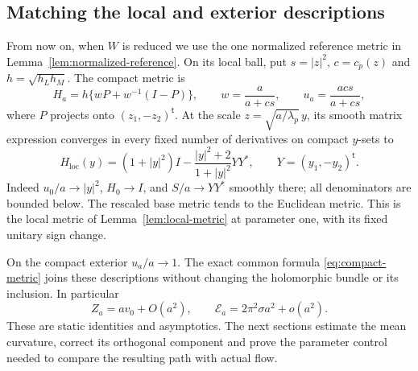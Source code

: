 \subsection{Matching the local and exterior descriptions}

From now on, when $W$ is reduced we use the one normalized
reference metric in Lemma~\ref{lem:normalized-reference}.
On its local ball, put $s=|z|^2$, $c=c_p(z)$ and
$h=\sqrt{h_Lh_M}$. The compact metric is
\begin{equation}\label{eq:compact-local-expression}
 H_a=h\{wP+w^{-1}(I-P)\},\qquad
 w=\frac{a}{a+cs},\qquad
 u_a=\frac{acs}{a+cs},
\end{equation}
where $P$ projects onto $(z_1,-z_2)^{\mathsf t}$.
At the scale $z=\sqrt{a/\lambda_p}\,y$, its smooth matrix
expression converges in every fixed number of derivatives
on compact $y$-sets to
\begin{equation}\label{eq:unit-local-profile}
 H_{\mathrm{loc}}(y)
   =(1+|y|^2)I-\frac{|y|^2+2}{1+|y|^2}YY^*,
                 \qquad Y=(y_1,-y_2)^{\mathsf t}.
\end{equation}
Indeed $u_0/a\to|y|^2$, $H_0\to I$, and
$S/a\to YY^*$ smoothly there; all denominators are bounded
below. The rescaled base metric tends to the Euclidean
metric. This is the local metric of
Lemma~\ref{lem:local-metric} at parameter one, with its
fixed unitary sign change.

On the compact exterior $u_a/a\to1$. The exact common
formula \eqref{eq:compact-metric} joins these descriptions
without changing the holomorphic bundle or its inclusion.
In particular
\begin{equation}\label{eq:balanced-static}
             Z_a=av_0+O(a^2),\qquad
             \mathcal E_a=2\pi^2\sigma a^2+o(a^2).
\end{equation}
These are static identities and asymptotics. The next
sections estimate the mean curvature, correct its
orthogonal component and prove the parameter control
needed to compare the resulting path with actual flow.
